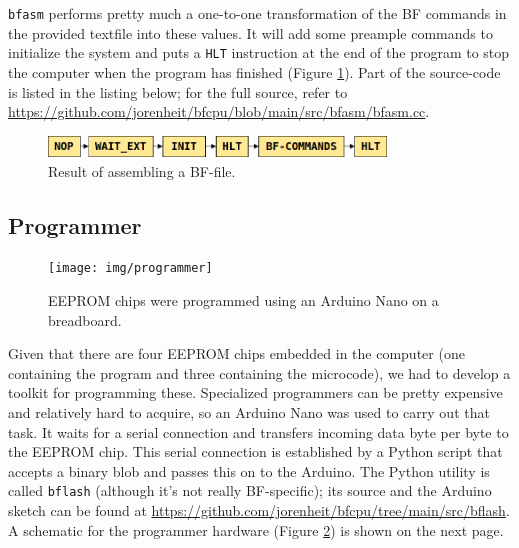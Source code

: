 \texttt{bfasm} performs pretty much a one-to-one transformation of the BF commands in the provided textfile into these values. It will add some preample commands to initialize the system and puts a \texttt{HLT} instruction at the end of the program to stop the computer when the program has finished (Figure \ref{fig:assembleoutput}). Part of the source-code is listed in the listing below; for the full source, refer to \url{https://github.com/jorenheit/bfcpu/blob/main/src/bfasm/bfasm.cc}.

\begin{figure}[H]
  \centering
  \includegraphics[width=0.8\textwidth]{img/assembleroutput}
  \caption{Result of assembling a BF-file.}
  \label{fig:assembleoutput}
\end{figure}


\subsection{Programmer}

\begin{figure}[H]
  \centering
  \texttt{[image: img/programmer]}
  \caption{EEPROM chips were programmed using an Arduino Nano on a breadboard.}
  \label{fig:programmer}
\end{figure}

Given that there are four EEPROM chips embedded in the computer (one containing the program and three containing the microcode), we had to develop a toolkit for programming these. Specialized programmers can be pretty expensive and relatively hard to acquire, so an Arduino Nano was used to carry out that task. It waits for a serial connection and transfers incoming data byte per byte to the EEPROM chip. This serial connection is established by a Python script that accepts a binary blob and passes this on to the Arduino. The Python utility is called \texttt{bflash} (although it's not really BF-specific); its source and the Arduino sketch can be found at \url{https://github.com/jorenheit/bfcpu/tree/main/src/bflash}. A schematic for the programmer hardware (Figure \ref{fig:programmer}) is shown on the next page.



